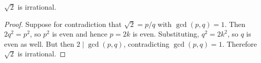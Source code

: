 \documentclass{article}
\begin{document}
\begin{theorem}
$\sqrt{2}$ is irrational.
\end{theorem}

\begin{proof}
Suppose for contradiction that $\sqrt{2} = p/q$ with $\gcd(p,q) = 1$.
Then $2q^2 = p^2$, so $p^2$ is even and hence $p = 2k$ is even.
Substituting, $q^2 = 2k^2$, so $q$ is even as well.
But then $2 \mid \gcd(p,q)$, contradicting $\gcd(p,q) = 1$.
Therefore $\sqrt{2}$ is irrational.
\end{proof}
\end{document}
